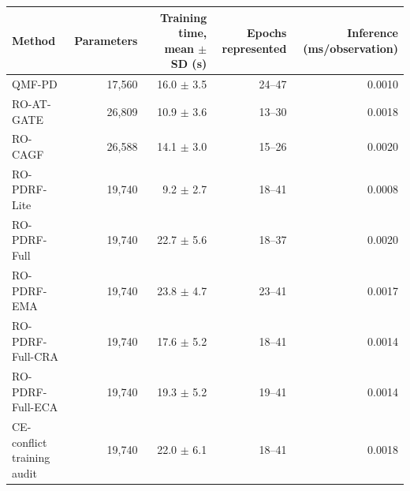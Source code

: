 \begin{tabular}{lrrrr}
\toprule
Method & Parameters & Training time, mean $\pm$ SD (s) & Epochs represented & Inference (ms/observation) \\
\midrule
QMF-PD & 17,560 & 16.0 $\pm$ 3.5 & 24--47 & 0.0010 \\
RO-AT-GATE & 26,809 & 10.9 $\pm$ 3.6 & 13--30 & 0.0018 \\
RO-CAGF & 26,588 & 14.1 $\pm$ 3.0 & 15--26 & 0.0020 \\
RO-PDRF-Lite & 19,740 & 9.2 $\pm$ 2.7 & 18--41 & 0.0008 \\
RO-PDRF-Full & 19,740 & 22.7 $\pm$ 5.6 & 18--37 & 0.0020 \\
RO-PDRF-EMA & 19,740 & 23.8 $\pm$ 4.7 & 23--41 & 0.0017 \\
RO-PDRF-Full-CRA & 19,740 & 17.6 $\pm$ 5.2 & 18--41 & 0.0014 \\
RO-PDRF-Full-ECA & 19,740 & 19.3 $\pm$ 5.2 & 19--41 & 0.0014 \\
CE-conflict training audit & 19,740 & 22.0 $\pm$ 6.1 & 18--41 & 0.0018 \\
\bottomrule
\end{tabular}